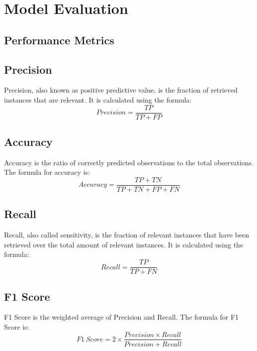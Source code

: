 \section{Model Evaluation}
\subsection{Performance Metrics}

\subsection*{Precision}
Precision, also known as positive predictive value, is the fraction of retrieved instances that are relevant. It is calculated using the formula:
\[ Precision = \frac{TP}{TP + FP} \]

\subsection*{Accuracy}
Accuracy is the ratio of correctly predicted observations to the total observations. The formula for accuracy is:
\[ Accuracy = \frac{TP + TN}{TP + TN + FP + FN} \]

\subsection{Recall}
Recall, also called sensitivity, is the fraction of relevant instances that have been retrieved over the total amount of relevant instances. It is calculated using the formula:
\[ Recall = \frac{TP}{TP + FN} \]

\subsection{F1 Score}
F1 Score is the weighted average of Precision and Recall. The formula for F1 Score is:
\[ F1\ Score = 2 \times \frac{Precision \times Recall}{Precision + Recall} \]



























\clearpage 

